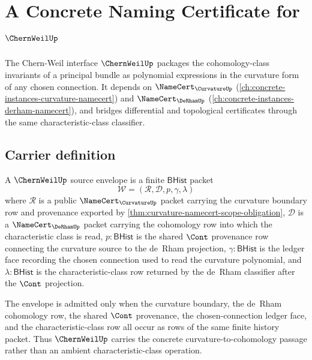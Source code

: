 \chapter{A Concrete Naming Certificate for $\ChernWeilUp$}
\label{ch:concrete-instances-chernweil-namecert}

The Chern-Weil interface $\ChernWeilUp$ packages the cohomology-class invariants of a principal bundle as polynomial expressions in the curvature form of any chosen connection. It depends on $\NameCert_{\CurvatureUp}$ (\autoref{ch:concrete-instances-curvature-namecert}) and $\NameCert_{\DeRhamUp}$ (\autoref{ch:concrete-instances-derham-namecert}), and bridges differential and topological certificates through the same characteristic-class classifier.

\section{Carrier definition}
\label{sec:chernweil-carrier}

\begin{definition}
\label{def:chernweil-source-envelope}
A $\ChernWeilUp$ source envelope is a finite $\mathsf{BHist}$ packet
$$
\mathcal{W}=(\mathcal{R},\mathcal{D},p,\gamma,\lambda)
$$
where $\mathcal{R}$ is a public $\NameCert_{\CurvatureUp}$ packet carrying the curvature boundary row and provenance exported by \autoref{thm:curvature-namecert-scope-obligation}, $\mathcal{D}$ is a $\NameCert_{\DeRhamUp}$ packet carrying the cohomology row into which the characteristic class is read, $p:\mathsf{BHist}$ is the shared $\Cont$ provenance row connecting the curvature source to the de~Rham projection, $\gamma:\mathsf{BHist}$ is the ledger face recording the chosen connection used to read the curvature polynomial, and $\lambda:\mathsf{BHist}$ is the characteristic-class row returned by the de~Rham classifier after the $\Cont$ projection.

The envelope is admitted only when the curvature boundary, the de~Rham cohomology row, the shared $\Cont$ provenance, the chosen-connection ledger face, and the characteristic-class row all occur as rows of the same finite history packet. Thus $\ChernWeilUp$ carries the concrete curvature-to-cohomology passage rather than an ambient characteristic-class operation.
\end{definition}

